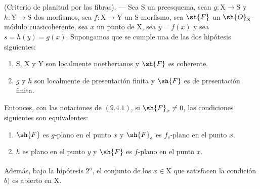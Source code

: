 \begin{theorem}[11.3.10]
\label{IV.11.3.10}
(Criterio de planitud por las fibras). --- Sea $\mathrm{S}$ un preesquema, sean $g:\mathrm{X}\to\mathrm{S}$ y $h:\mathrm{Y}\to\mathrm{S}$ dos morfismos, sea $f:\mathrm{X}\to\mathrm{Y}$ un $\mathrm{S}$-morfismo, sea $\sh{F}$ un $\sh{O}_\mathrm{X}$-módulo cuasicoherente, sea $x$ un punto de $\mathrm{X}$, sea $y=f(x)$ y sea $s=h(y)=g(x)$. Supongamos que se cumple una de las dos hipótesis siguientes:
\begin{enumerate}[label=\arabic{enumi}\textsuperscript{o}]
  \item $\mathrm{S}$, $\mathrm{X}$ y $\mathrm{Y}$ son localmente noetherianos y $\sh{F}$ es coherente.
  \item $g$ y $h$ son localmente de presentación finita y $\sh{F}$ es de presentación finita.
\end{enumerate}
Entonces, con las notaciones de $(9.4.1)$, si $\sh{F}_x\neq 0$, las condiciones siguientes son equivalentes:
\begin{enumerate}[label=\emph{\alph*)}]
  \item $\sh{F}$ es $g$-plano en el punto $x$ y $\sh{F}_s$ es $f_s$-plano en el punto $x$.
  \item $h$ es plano en el punto $y$ y $\sh{F}$ es $f$-plano en el punto $x$.
\end{enumerate}
Además, bajo la hipótesis 2\textsuperscript{o}, el conjunto de los $x\in\mathrm{X}$ que satisfacen la condición $b)$ es abierto en $\mathrm{X}$.
\end{theorem}

